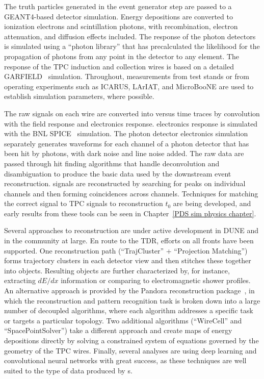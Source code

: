 The truth particles generated in the event generator step are passed to a {\sc GEANT4}-based detector simulation.  Energy depositions are converted to ionization electrons and scintillation photons, with recombination, electron attenuation, and diffusion effects included.  The response of the photon detectors is simulated using a ``photon library'' that has precalculated the likelihood for the propagation of photons from any point in the detector to any  element.  The response of the TPC induction and collection wires is based on a detailed GARFIELD~\cite{garfield} simulation.  Throughout, measurements from test stands or from operating \lartpc experiments such as ICARUS, LArIAT, and MicroBooNE are used to establish simulation parameters, where possible.

The raw signals on each wire are converted into  versus time traces by convolution with the field response and electronics response.   electronics response is simulated with the BNL SPICE~\cite{spice} simulation.  The photon detector electronics simulation separately generates waveforms for each channel of a photon detector that has been hit by photons, with dark noise and line noise added.  The raw data are passed through hit finding algorithms that handle deconvolution and disambiguation to produce the basic data used by the downstream event reconstruction.  signals are reconstructed by searching for peaks on individual channels and then forming coincidences across channels. Techniques for matching the correct  signal to TPC signals to reconstruction $t_0$ are being developed, and early results from these tools can be seen in Chapter~\ref{PDS sim physics chapter}. 

Several approaches to \lartpc reconstruction are under active development in DUNE and in the community at large.  En route to the TDR, efforts on all fronts have been supported.  One  reconstruction path (``TrajCluster'' + ``Projection Matching'') forms \twod trajectory clusters in each detector view and then stitches these together into \threed objects.  Resulting objects are further characterized by, for instance, extracting $dE/dx$ information or comparing to electromagnetic shower profiles.  An alternative approach is provided by the Pandora reconstruction package~\cite{Marshall:2015rfa}, in which the reconstruction and pattern recognition task is broken down into a large number of decoupled algorithms, where each algorithm addresses a specific task or targets a particular topology.  Two additional algorithms (``WireCell'' and ``SpacePointSolver'') take a different approach and create \threed maps of energy depositions directly by solving a constrained system of equations governed by the geometry of the TPC wires.  Finally, several analyses are using deep learning and convolutional neural networks with great success, as these techniques are well suited to the type of data produced by \lartpc{}s.

